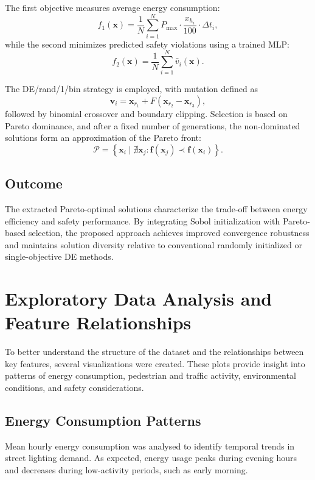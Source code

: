 \documentclass[conference]{IEEEtran}
\begin{document}
The first objective measures average energy consumption:
\begin{equation}
f_1(\mathbf{x}) = \frac{1}{N} \sum_{i=1}^{N} P_{\max} \cdot \frac{x_{h_i}}{100} \cdot \Delta t_i,
\end{equation}
while the second minimizes predicted safety violations using a trained MLP:
\begin{equation}
f_2(\mathbf{x}) = \frac{1}{N} \sum_{i=1}^{N} \hat{v}_i(\mathbf{x}).
\end{equation}

The DE/rand/1/bin strategy is employed, with mutation defined as
\begin{equation}
\mathbf{v}_i = \mathbf{x}_{r_1} + F(\mathbf{x}_{r_2} - \mathbf{x}_{r_3}),
\end{equation}
followed by binomial crossover and boundary clipping. Selection is based on Pareto dominance, and after a fixed number of generations, the non-dominated solutions form an approximation of the Pareto front:
\begin{equation}
\mathcal{P} = \left\{ \mathbf{x}_i \mid \nexists \mathbf{x}_j : \mathbf{f}(\mathbf{x}_j) \prec \mathbf{f}(\mathbf{x}_i) \right\}.
\end{equation}

\subsection{Outcome}

The extracted Pareto-optimal solutions characterize the trade-off between energy efficiency and safety performance. By integrating Sobol initialization with Pareto-based selection, the proposed approach achieves improved convergence robustness and maintains solution diversity relative to conventional randomly initialized or single-objective DE methods.

\section{Exploratory Data Analysis and Feature Relationships}
To better understand the structure of the dataset and the relationships between key features, several visualizations were created. These plots provide insight into patterns of energy consumption, pedestrian and traffic activity, environmental conditions, and safety considerations.

\subsection{Energy Consumption Patterns}
Mean hourly energy consumption was analysed to identify temporal trends in street lighting demand. As expected, energy usage peaks during evening hours and decreases during low-activity periods, such as early morning. 
\end{document}

